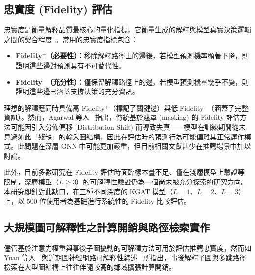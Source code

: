 \subsection*{忠實度 (Fidelity) 評估}

忠實度是衡量解釋品質最核心的量化指標，它衡量生成的解釋與模型真實決策邏輯之間的契合程度~\cite{yuan2022explainability}。常用的忠實度指標包含：

\begin{itemize}[leftmargin=2em]
  \item \textbf{Fidelity$^+$（必要性）：}移除解釋路徑上的邊後，若模型預測機率顯著下降，則證明這些邊對預測具有不可替代性。
  \item \textbf{Fidelity$^-$（充分性）：}僅保留解釋路徑上的邊，若模型預測機率幾乎不變，則證明這些邊已涵蓋支撐決策的充分資訊。
\end{itemize}

理想的解釋應同時具備高 Fidelity$^+$（標記了關鍵邊）與低 Fidelity$^-$（涵蓋了完整資訊）。然而，Agarwal 等人~\cite{agarwal2024fidelity} 指出，傳統基於遮罩 (masking) 的 Fidelity 評估方法可能因引入分佈偏移 (Distribution Shift) 而導致失真——模型在訓練期間從未見過如此「殘缺」的輸入圖結構，因此在評估時的預測行為可能偏離其正常運作模式。此問題在深層 GNN 中可能更加嚴重，但目前相關文獻甚少在推薦場景中加以討論。

此外，目前多數研究在 Fidelity 評估時面臨樣本量不足、僅在淺層模型上驗證等限制，深層模型（$L \geq 3$）的可解釋性驗證仍為一個尚未被充分探索的研究方向。本研究即針對此缺口，在三種不同深度的 KGAT 模型（$L{=}1$、$L{=}2$、$L{=}3$）上，以 500 位使用者為基礎進行系統性的 Fidelity 比較評估。

\subsection*{大規模圖可解釋性之計算開銷與路徑檢索實作}

儘管基於注意力權重與事後子圖擾動的可解釋方法可用於評估推薦忠實度，然而如 Yuan 等人~\cite{yuan2022explainability} 與近期圖神經網路可解釋性綜述~\cite{li2025can} 所指出，事後解釋子圖與多跳路徑檢索在大型圖結構上往往伴隨較高的鄰域擴張計算開銷。

